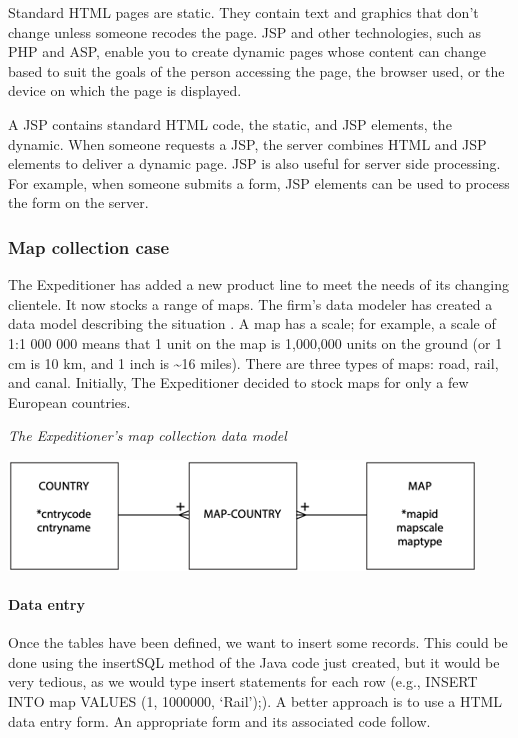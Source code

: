 \documentclass[
]{article}
\begin{document}
Standard HTML pages are static. They contain text and graphics that
don't change unless someone recodes the page. JSP and other
technologies, such as PHP and ASP, enable you to create dynamic pages
whose content can change based to suit the goals of the person accessing
the page, the browser used, or the device on which the page is
displayed.

A JSP contains standard HTML code, the static, and JSP elements, the
dynamic. When someone requests a JSP, the server combines HTML and JSP
elements to deliver a dynamic page. JSP is also useful for server side
processing. For example, when someone submits a form, JSP elements can
be used to process the form on the server.

\hypertarget{map-collection-case}{%
\subsubsection*{Map collection case}\label{map-collection-case}}

The Expeditioner has added a new product line to meet the needs of its
changing clientele. It now stocks a range of maps. The firm's data
modeler has created a data model describing the situation . A map has a
scale; for example, a scale of 1:1 000 000 means that 1 unit on the map
is 1,000,000 units on the ground (or 1 cm is 10 km, and 1 inch is \textasciitilde16
miles). There are three types of maps: road, rail, and canal. Initially,
The Expeditioner decided to stock maps for only a few European
countries.

\emph{The Expeditioner's map collection data model}

\includegraphics{Figures/Chapter 22/map-collection.png}

\hypertarget{data-entry}{%
\paragraph*{Data entry}\label{data-entry}}

Once the tables have been defined, we want to insert some records. This
could be done using the insertSQL method of the Java code just created,
but it would be very tedious, as we would type insert statements for
each row (e.g., INSERT INTO map VALUES (1, 1000000, `Rail');). A better
approach is to use a HTML data entry form. An appropriate form and its
associated code follow.
\end{document}

